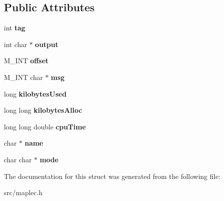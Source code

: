 \subsection*{Public Attributes}
\begin{DoxyCompactItemize}
\item 
\hypertarget{struct_m_call_back_vector_desc_a985cae03e919f2a5f783109ce1032c99}{
int {\bfseries tag}}
\label{struct_m_call_back_vector_desc_a985cae03e919f2a5f783109ce1032c99}

\item 
\hypertarget{struct_m_call_back_vector_desc_a11f47cbae3c7384c1e59005069c50a26}{
int char $\ast$ {\bfseries output}}
\label{struct_m_call_back_vector_desc_a11f47cbae3c7384c1e59005069c50a26}

\item 
\hypertarget{struct_m_call_back_vector_desc_ab5e874092abb409673e43ae559f60241}{
M\_\-INT {\bfseries offset}}
\label{struct_m_call_back_vector_desc_ab5e874092abb409673e43ae559f60241}

\item 
\hypertarget{struct_m_call_back_vector_desc_a4dd4db35995baee617d413908459ec97}{
M\_\-INT char $\ast$ {\bfseries msg}}
\label{struct_m_call_back_vector_desc_a4dd4db35995baee617d413908459ec97}

\item 
\hypertarget{struct_m_call_back_vector_desc_a9231323f1a7f71c5d30a0fe61ded977e}{
long {\bfseries kilobytesUsed}}
\label{struct_m_call_back_vector_desc_a9231323f1a7f71c5d30a0fe61ded977e}

\item 
\hypertarget{struct_m_call_back_vector_desc_a04a99e9b38ef6c3319684c196c51b609}{
long long {\bfseries kilobytesAlloc}}
\label{struct_m_call_back_vector_desc_a04a99e9b38ef6c3319684c196c51b609}

\item 
\hypertarget{struct_m_call_back_vector_desc_a7214ccc37f55da6396d4f073d6d1221a}{
long long double {\bfseries cpuTime}}
\label{struct_m_call_back_vector_desc_a7214ccc37f55da6396d4f073d6d1221a}

\item 
\hypertarget{struct_m_call_back_vector_desc_a039fa5856cec894096304168db54addf}{
char $\ast$ {\bfseries name}}
\label{struct_m_call_back_vector_desc_a039fa5856cec894096304168db54addf}

\item 
\hypertarget{struct_m_call_back_vector_desc_ab9328567388547b2526a3eb19fc317d1}{
char char $\ast$ {\bfseries mode}}
\label{struct_m_call_back_vector_desc_ab9328567388547b2526a3eb19fc317d1}

\end{DoxyCompactItemize}


The documentation for this struct was generated from the following file:\begin{DoxyCompactItemize}
\item 
src/maplec.h\end{DoxyCompactItemize}

